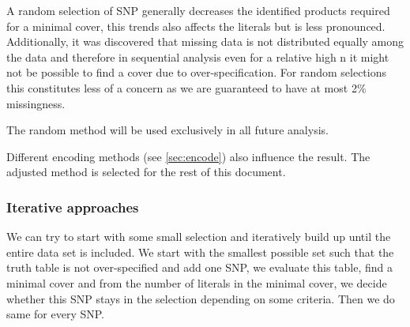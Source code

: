 \documentclass[letterpaper, 11pt]{article}
\begin{document}
A random selection of SNP generally decreases the identified products required for a minimal cover, this trends also affects the literals but is less pronounced. Additionally, it was discovered that missing data is not distributed equally among the data and therefore in sequential analysis even for a relative high n it might not be possible to find a cover due to over-specification. For random selections this constitutes less of a concern as we are guaranteed to have at most 2\% missingness.  



The random method will be used exclusively in all future analysis. 


Different encoding methods (see \ref{sec:encode}) also influence the result. The adjusted method is selected for the rest of this document. 




\subsubsection{Iterative approaches}
\begin{figure} [!h] 
\end{figure}
We can try to start with some small selection and iteratively build up until the entire data set is included. We start with the smallest possible set such that the truth table is not over-specified and add one SNP, we evaluate this table, find a minimal cover and from the number of literals in the minimal cover, we decide whether this SNP stays in the selection depending on some criteria. Then we do same for every SNP. 
\end{document}
